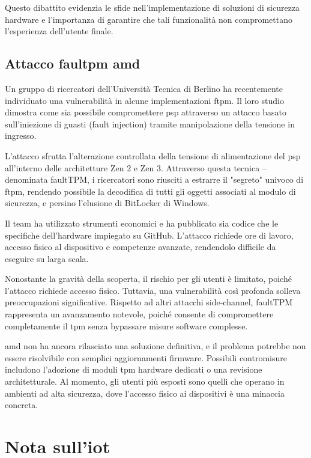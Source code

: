 Questo dibattito evidenzia le sfide nell'implementazione di soluzioni di sicurezza hardware e l'importanza di garantire che tali funzionalità non compromettano l'esperienza dell'utente finale.

\subsection{\texorpdfstring{Attacco faul\acrshort{tpm} \acrshort{amd}}{Attacco faulTPM AMD}}\label{subsec:attacco_faultpm_amd}

Un gruppo di ricercatori dell'Università Tecnica di Berlino ha recentemente individuato una vulnerabilità in alcune implementazioni \acrshort{ftpm}. Il loro studio dimostra come sia possibile compromettere \acrshort{psp} attraverso un attacco basato sull'iniezione di guasti (fault injection) tramite manipolazione della tensione in ingresso.

L’attacco sfrutta l'alterazione controllata della tensione di alimentazione del \acrshort{psp} all'interno delle architetture Zen 2 e Zen 3. Attraverso questa tecnica -- denominata faultTPM, i ricercatori sono riusciti a estrarre il "segreto" univoco di \acrshort{ftpm}, rendendo possibile la decodifica di tutti gli oggetti associati al modulo di sicurezza, e persino l’elusione di BitLocker di Windows.

Il team ha utilizzato strumenti economici e ha pubblicato sia codice che le specifiche dell’hardware impiegato su GitHub. L'attacco richiede ore di lavoro, accesso fisico al dispositivo e competenze avanzate, rendendolo difficile da eseguire su larga scala.

Nonostante la gravità della scoperta, il rischio per gli utenti è limitato, poiché l'attacco richiede accesso fisico. Tuttavia, una vulnerabilità così profonda solleva preoccupazioni significative. Rispetto ad altri attacchi side-channel, faultTPM rappresenta un avanzamento notevole, poiché consente di compromettere completamente il \acrshort{tpm} senza bypassare misure software complesse.

\acrshort{amd} non ha ancora rilasciato una soluzione definitiva, e il problema potrebbe non essere risolvibile con semplici aggiornamenti firmware. Possibili contromisure includono l'adozione di moduli \acrshort{tpm} hardware dedicati o una revisione architetturale. Al momento, gli utenti più esposti sono quelli che operano in ambienti ad alta sicurezza, dove l'accesso fisico ai dispositivi è una minaccia concreta.

\clearpage
\section{\texorpdfstring{Nota sull'\acrshort{iot}}{Nota sull'IoT}}\label{sec:nota_iot}


